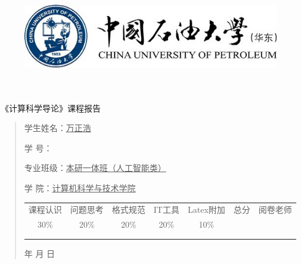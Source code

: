\documentclass{article}
\renewcommand{\today}{\number\year 年 \number\month 月 \number\day 日}
\begin{document}
\begin{figure}
    \centering
    \includegraphics{upc.jpg}

    \label{figupc}
\end{figure}

	\begin{center}
		\quad \\
		\quad \\
		\heiti \fontsize{45}{17} \quad \quad \quad 
		\vskip 1.5cm
		\heiti {} 《计算科学导论》课程报告
	\end{center}
	\vskip 3.0cm
		
	\begin{quotation}

		\doublespacing
		
        \par\setlength\parindent{7em}
		\quad 


		学生姓名：\underline{\qquad  万正浩 \qquad}

		学\hspace{0.61cm} 号：\underline{\qquad}
		
		专业班级：\underline{\qquad 本研一体班（人工智能类） \qquad  }
		
        学\hspace{0.61cm} 院：\underline{计算机科学与技术学院}
		\vskip 3cm
		\centering
		\begin{table}[h]
            \centering 
            \begin{tabular}{|c|c|c|c|c|c|c|}
                \hline
                课程认识 & 问题思考 & 格式规范 & IT工具 & Latex附加 & 总分 & 阅卷老师 \\
                30\% & 20\% & 20\% & 20\% & 10\% &  &  \\
                \hline
                 & & & & & &\\
                & & & & & &\\
                \hline
            \end{tabular}
        \end{table}
		\today
	\end{quotation}
\end{document}
